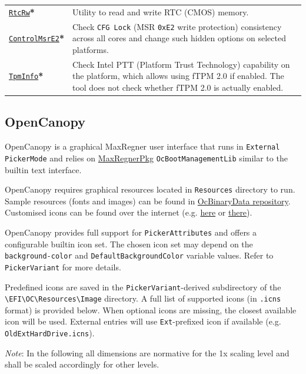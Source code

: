 \documentclass[]{article}
\begin{document}
\begin{tabular}{p{1.3in}p{5.55in}}
\href{https://github.com/acidanthera/MaxRegnerPkg}{\texttt{RtcRw}}\textbf{*}
& Utility to read and write RTC (CMOS) memory. \\
\href{https://github.com/acidanthera/MaxRegnerPkg}{\texttt{ControlMsrE2}}\textbf{*}
& Check \texttt{CFG Lock} (MSR \texttt{0xE2} write protection) consistency
across all cores and change such hidden options on selected platforms. \\
\href{https://github.com/acidanthera/MaxRegnerPkg}{\texttt{TpmInfo}}\textbf{*}
& Check Intel PTT (Platform Trust Technology) capability on the platform,
which allows using fTPM 2.0 if enabled. The tool does not check whether fTPM 2.0
is actually enabled.
\end{tabular}

\subsection{OpenCanopy}\label{ueficanopy}

OpenCanopy is a graphical MaxRegner user interface that runs in
\texttt{External} \texttt{PickerMode} and relies on
\href{https://github.com/acidanthera/MaxRegnerPkg}{MaxRegnerPkg} \texttt{OcBootManagementLib}
similar to the builtin text interface.

OpenCanopy requires graphical resources located in \texttt{Resources} directory to run.
Sample resources (fonts and images) can be found in
\href{https://github.com/acidanthera/OcBinaryData}{OcBinaryData repository}. Customised icons can be found over the internet
(e.g. \href{https://github.com/blackosx/OpenCanopyIcons}{here} or \href{https://applelife.ru/threads/kastomizacija-opencanopy.2945020/}{there}).

OpenCanopy provides full support for \texttt{PickerAttributes} and offers a configurable
builtin icon set. The chosen icon set may depend on the \texttt{background-color} and
\texttt{DefaultBackgroundColor} variable values. Refer to \texttt{PickerVariant} for more details.

Predefined icons are saved in the \texttt{PickerVariant}-derived subdirectory of the
\texttt{\textbackslash EFI\textbackslash OC\textbackslash Resources\textbackslash Image}
directory. A full list of supported icons (in \texttt{.icns} format) is provided below. When optional icons
are missing, the closest available icon will be used. External entries will use \texttt{Ext}-prefixed
icon if available (e.g. \texttt{OldExtHardDrive.icns}).

\emph{Note}: In the following all dimensions are normative for the 1x scaling level and shall be
scaled accordingly for other levels.
\end{document}
